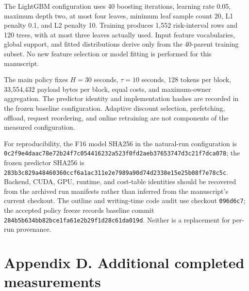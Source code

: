 \documentclass[
  english,
  10pt,
]{article}
\begin{document}
The LightGBM configuration uses 40 boosting iterations, learning rate
0.05, maximum depth two, at most four leaves, minimum leaf sample count
20, L1 penalty 0.1, and L2 penalty 10. Training produces 1,552
risk-interval rows and 120 trees, with at most three leaves actually
used. Input feature vocabularies, global support, and fitted
distributions derive only from the 40-parent training subset. No new
feature selection or model fitting is performed for this manuscript.

The main policy fixes \(H=30\) seconds, \(\tau=10\) seconds, 128 tokens
per block, 33,554,432 payload bytes per block, equal costs, and
maximum-owner aggregation. The predictor identity and implementation
hashes are recorded in the frozen baseline configuration. Adaptive
discount selection, prefetching, offload, request reordering, and online
retraining are not components of the measured configuration.

For reproducibility, the F16 model SHA256 in the natural-run
configuration is
\nolinkurl{0c2f9e4daac78e72b24f7c054416232a523f0fd2aeb37653747d3c21f7dca078};
the frozen predictor SHA256 is
\nolinkurl{283b3c829a48460360ccf6a1ac311e2e7989a90d74d2338e15e25b08f7e78c5c}.
Backend, CUDA, GPU, runtime, and cost-table identities should be
recovered from the archived run manifests rather than inferred from the
manuscript's current checkout. The outline and writing-time code audit
use checkout \nolinkurl{096d6c7}; the accepted policy freeze records
baseline commit \nolinkurl{284b5b634bb82bce1fa61e2b29f1d28c61da019d}.
Neither is a replacement for per-run provenance.

\section{Appendix D. Additional completed
measurements}\label{appendix-d.-additional-completed-measurements}
\end{document}
